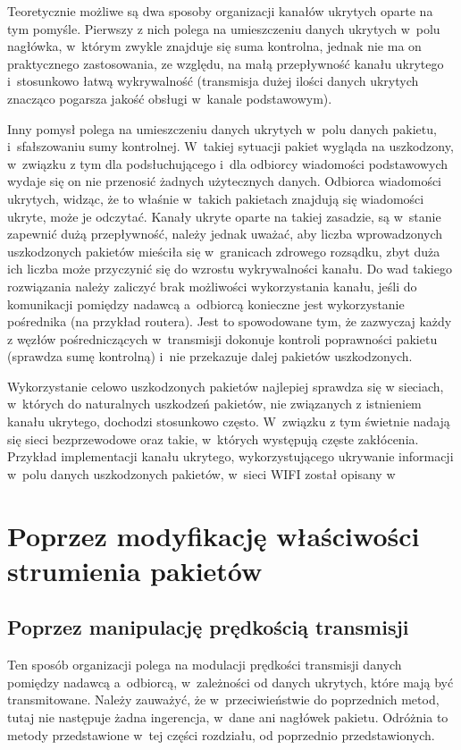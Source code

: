 \documentclass[a4paper, twoside, 12pt]{report}
\begin{document}
        Teoretycznie możliwe są dwa
        sposoby organizacji kanałów ukrytych oparte na tym pomyśle. Pierwszy z nich polega na umieszczeniu
        danych ukrytych w~polu nagłówka, w~którym zwykle znajduje się suma kontrolna,
        jednak nie ma on praktycznego zastosowania, ze względu, na małą przepływność
        kanału ukrytego i~stosunkowo łatwą wykrywalność (transmisja dużej ilości
        danych ukrytych znacząco pogarsza jakość obsługi w~kanale podstawowym).

        Inny pomysł polega
        na umieszczeniu danych ukrytych w~polu danych pakietu, i~sfałszowaniu sumy
        kontrolnej. W~takiej sytuacji pakiet wygląda na uszkodzony, w~związku z tym
        dla podsłuchującego i~dla odbiorcy wiadomości podstawowych wydaje się
        on nie przenosić żadnych użytecznych danych. Odbiorca wiadomości ukrytych,
        widząc, że to właśnie w~takich pakietach znajdują się wiadomości ukryte,
        może je odczytać. Kanały ukryte oparte na takiej zasadzie, są w~stanie
        zapewnić dużą przepływność, należy jednak uważać, aby liczba wprowadzonych
        uszkodzonych pakietów mieściła się w~granicach zdrowego rozsądku, zbyt duża
        ich liczba może przyczynić się do wzrostu wykrywalności kanału. Do wad takiego
        rozwiązania należy zaliczyć brak możliwości wykorzystania kanału, jeśli do
        komunikacji pomiędzy nadawcą a~odbiorcą konieczne jest wykorzystanie pośrednika (na przykład routera).
        Jest to spowodowane tym, że zazwyczaj każdy z węzłów pośredniczących w~transmisji
        dokonuje kontroli poprawności pakietu (sprawdza sumę kontrolną) i~nie przekazuje
        dalej pakietów uszkodzonych.

        Wykorzystanie celowo uszkodzonych pakietów najlepiej sprawdza się w
        sieciach, w~których do naturalnych uszkodzeń pakietów, nie związanych z
        istnieniem kanału ukrytego, dochodzi stosunkowo często. W~związku z tym
        świetnie nadają się sieci bezprzewodowe oraz takie, w~których występują
        częste zakłócenia. Przykład implementacji kanału ukrytego, wykorzystującego
        ukrywanie informacji w~polu danych uszkodzonych pakietów, w~sieci WIFI
        został opisany w~\cite{HICCUPS}

    \section{Poprzez modyfikację właściwości strumienia pakietów} \label{MODYFIKACJASTRUMIENIA}
        \subsection{Poprzez manipulację prędkością transmisji}
        Ten sposób organizacji polega na modulacji prędkości transmisji danych
        pomiędzy nadawcą a~odbiorcą, w~zależności od danych ukrytych, które mają
        być transmitowane. Należy zauważyć, że w~przeciwieństwie do poprzednich
        metod, tutaj nie następuje żadna ingerencja, w~dane ani nagłówek pakietu.
        Odróżnia to metody przedstawione w~tej części rozdziału, od poprzednio
        przedstawionych.
\end{document}
